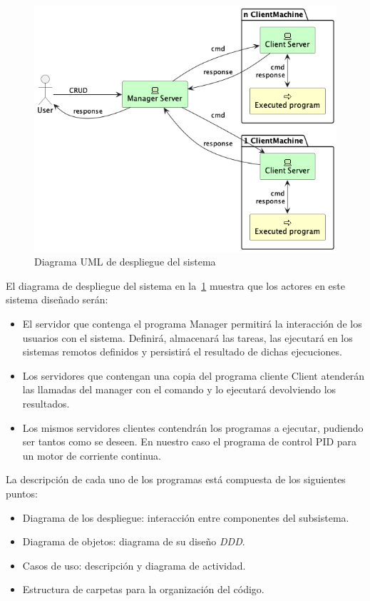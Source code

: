 
\begin{figure}[H]
    \centering
    \includegraphics[height=0.4\textheight]{./part/Proyecto_ejecutivo/memoria_descriptiva/descripcionDelProyecto/manager/uml/systemConcept}
    \caption{Diagrama UML de despliegue del sistema}\label{fig:Diagrama UML de despliegue del sistema}
\end{figure}

El diagrama de despliegue del sistema en la~\cref{fig:Diagrama UML de despliegue del sistema} muestra que los actores en este sistema diseñado serán:
\begin{itemize}
    \item El servidor que contenga el programa \gls{Manager} permitirá la interacción de los usuarios con el sistema.
    Definirá, almacenará las tareas, las ejecutará en los sistemas remotos definidos y persistirá el resultado de dichas ejecuciones.
    \item Los servidores que contengan una copia del programa cliente \gls{Client} atenderán las llamadas del manager con el comando y lo ejecutará devolviendo los resultados.
    \item Los mismos servidores clientes contendrán los programas a ejecutar, pudiendo ser tantos como se deseen.
    En nuestro caso el programa de control PID para un motor de corriente continua.
\end{itemize}

La descripción de cada uno de los programas está compuesta de los siguientes puntos:

\begin{itemize}
    \item Diagrama de los despliegue: interacción entre componentes del subsistema.
    \item Diagrama de objetos: diagrama de su diseño \textit{DDD}.
    \item Casos de uso: descripción y diagrama de actividad.
    \item Estructura de carpetas para la organización del código.
\end{itemize}

